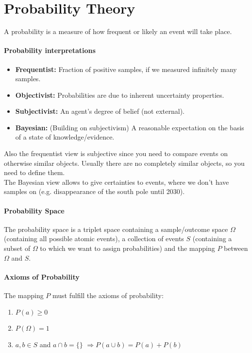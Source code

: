 \documentclass[../main.tex]{subfiles}
\begin{document}
\section{Probability Theory} \label{probability}
A probability is a measure of how frequent or likely an event will take place. 

    \paragraph{Probability interpretations}
        \begin{itemize}
            \item [] \textbf{Frequentist:} Fraction of positive samples, if we measured infinitely many samples.
            \item [] \textbf{Objectivist:} Probabilities are due to inherent uncertainty properties.
            \item [] \textbf{Subjectivist:} An agent's degree of belief (not external).
            \item [] \textbf{Bayesian:} (Building on subjectivism) A reasonable expectation on the basis of a state of knowledge/evidence.
        \end{itemize}
        \attention Also the frequentist view is subjective since you need to compare events on otherwise similar objects. Usually there are no completely similar objects, so you need to define them. \\
        \btw The Bayesian view allows to give certainties to events, where we don't have samples on (e.g. disappearance of the south pole until 2030).

    \paragraph{Probability Space}  The probability space is a triplet space containing a sample/outcome space $\Omega$ (containing all possible atomic events), a collection of events $S$ (containing a subset of $\Omega$ to which we want to assign probabilities) and the mapping $P$ between $\Omega$ and $S$. 

    \paragraph{Axioms of Probability}  The mapping $P$ must fulfill the axioms of probability: 
            \begin{enumerate}
                \item $P(a) \geq 0$
                \item $P(\Omega) = 1$
                \item $a,b \in S$ and $a \cap b = \{\}$ $ \Rightarrow P(a \cup b) = P(a) + P(b)$
            \end{enumerate}
\end{document}
